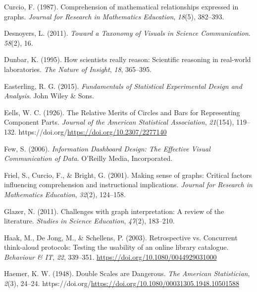 \documentclass[
  10pt,
  letterpaper,
  DIV=11,
  numbers=noendperiod]{scrartcl}
\newlength{\cslhangindent}
\newenvironment{CSLReferences}[2] %
 {\begin{list}{}{%
  \setlength{\itemindent}{0pt}
  \setlength{\leftmargin}{0pt}
  \setlength{\parsep}{0pt}
  \ifodd #1
   \setlength{\leftmargin}{\cslhangindent}
   \setlength{\itemindent}{-1\cslhangindent}
  \fi
  \setlength{\itemsep}{#2\baselineskip}}}
 {\end{list}}
\begin{document}
\begin{CSLReferences}{1}{0}
Curcio, F. (1987). Comprehension of mathematical relationships expressed
in graphs. \emph{Journal for Research in Mathematics Education},
\emph{18}(5), 382--393.

Desnoyers, L. (2011). \emph{Toward a {Taxonomy} of {Visuals} in
{Science} {Communication}}. \emph{58}(2), 16.

Dunbar, K. (1995). How scientists really reason: {Scientific} reasoning
in real-world laboratories. \emph{The Nature of Insight}, \emph{18},
365--395.

Easterling, R. G. (2015). \emph{Fundamentals of {Statistical
Experimental Design} and {Analysis}}. John Wiley \& Sons.

Eells, W. C. (1926). The {Relative} {Merits} of {Circles} and {Bars} for
{Representing} {Component} {Parts}. \emph{Journal of the American
Statistical Association}, \emph{21}(154), 119--132.
https://doi.org/\url{https://doi.org/10.2307/2277140}

Few, S. (2006). \emph{Information {Dashboard} {Design}: {The}
{Effective} {Visual} {Communication} of {Data}}. O'Reilly Media,
Incorporated.

Friel, S., Curcio, F., \& Bright, G. (2001). Making sense of graphs:
Critical factors influencing comprehension and instructional
implications. \emph{Journal for Research in Mathematics Education},
\emph{32}(2), 124--158.

Glazer, N. (2011). Challenges with graph interpretation: A review of the
literature. \emph{Studies in Science Education}, \emph{47}(2), 183--210.

Haak, M., De Jong, M., \& Schellens, P. (2003). Retrospective vs.
Concurrent think-aloud protocols: Testing the usability of an online
library catalogue. \emph{Behaviour \& {IT}}, \emph{22}, 339--351.
\url{https://doi.org/10.1080/0044929031000}

Haemer, K. W. (1948). Double {Scales} are {Dangerous}. \emph{The
American Statistician}, \emph{2}(3), 24--24.
https://doi.org/\url{https://doi.org/10.1080/00031305.1948.10501588}


\end{CSLReferences}
\end{document}
